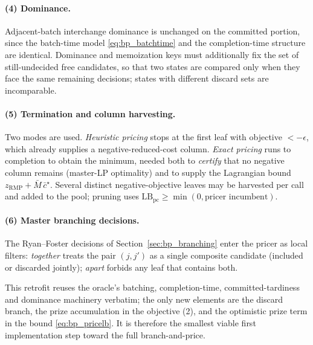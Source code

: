 \documentclass[review,3p,times,authoryear]{elsarticle}
\newcommand{\Mbar}{\bar{M}}
\begin{document}
\paragraph{(4) Dominance.} Adjacent-batch interchange dominance is unchanged on the
committed portion, since the batch-time model \eqref{eq:bp_batchtime} and the
completion-time structure are identical. Dominance and memoization keys must
additionally fix the set of still-undecided free candidates, so that two states are
compared only when they face the same remaining decisions; states with different
discard sets are incomparable.

\paragraph{(5) Termination and column harvesting.} Two modes are used.
\emph{Heuristic pricing} stops at the first leaf with objective $<-\epsilon$, which
already supplies a negative-reduced-cost column. \emph{Exact pricing} runs to
completion to obtain the minimum, needed both to \emph{certify} that no negative
column remains (master-LP optimality) and to supply the Lagrangian bound
$z_{\mathrm{RMP}}+\Mbar\,\bar c^\star$. Several distinct negative-objective leaves
may be harvested per call and added to the pool; pruning uses
$\mathrm{LB}_{\mathrm{pc}}\ge\min(0,\text{pricer incumbent})$.

\paragraph{(6) Master branching decisions.} The Ryan--Foster decisions of
Section~\ref{sec:bp_branching} enter the pricer as local filters: \emph{together}
treats the pair $(j,j')$ as a single composite candidate (included or discarded
jointly); \emph{apart} forbids any leaf that contains both.

This retrofit reuses the oracle's batching, completion-time, committed-tardiness
and dominance machinery verbatim; the only new elements are the discard branch, the
prize accumulation in the objective \textnormal{(2)}, and the optimistic prize term
in the bound \eqref{eq:bp_pricelb}. It is therefore the smallest viable first
implementation step toward the full branch-and-price.
\end{document}
